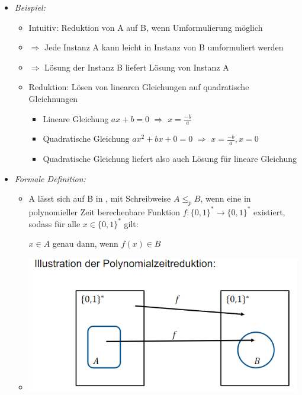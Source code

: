 \documentclass[
    12pt,
    a4paper,
    ngerman,
    color=3b,%
    marginpar=false,
    colorback=false,
    leqno,
]{tudaexercise}
\begin{document}
\begin{itemize}
\begin{itemize}
              \item \textit{Beispiel:}
                    \begin{itemize}
                        \item Intuitiv: Reduktion von A auf B, wenn Umformulierung möglich
                        \item[] $\Rightarrow$ Jede Instanz A kann leicht in Instanz von B umformuliert werden
                        \item[] $\Rightarrow$ Lösung der Instanz B liefert Lösung von Instanz A
                        \item Reduktion: Lösen von linearen Gleichungen auf quadratische Gleichnungen
                              \begin{itemize}
                                  \item Lineare Gleichung $ax + b = 0$ $\Rightarrow$ $x= \frac{-b}{a}$
                                  \item Quadratische Gleichung $ax^2 + bx + 0 = 0$ $\Rightarrow$ $x = \frac{-b}{a}, x = 0$
                                  \item Quadratische Gleichung liefert also auch Lösung für lineare Gleichung
                              \end{itemize}
                    \end{itemize}

              \item \textit{Formale Definition:}
                    \begin{itemize}
                        \item[]
                              A lässt sich auf B in , mit Schreibweise $A \leq_p B$, wenn eine
                              in polynomieller Zeit berechenbare Funktion $f: \{0,1\}^* \rightarrow \{0,1\}^*$ existiert, sodass
                              für alle $x \in \{0,1\}^*$ gilt: \\
                              \centerline{$x \in A$ genau dann, wenn $f(x)\in B$}
                        \item[] \includegraphics[width=12cm]{pictures/reduktion2.PNG}
                    \end{itemize}
          \end{itemize}


\end{itemize}
\end{document}
